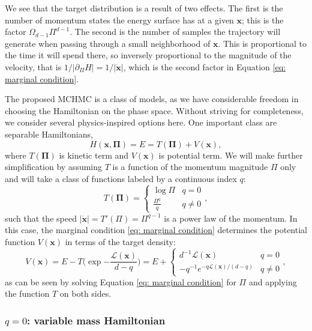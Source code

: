 \documentclass[twoside,11pt]{article}
\newcommand{\p}{\boldsymbol{\Pi}}
\newcommand{\x}{\boldsymbol{x}}
\begin{document}
We see that the target distribution is a result of two effects. The first is the number of momentum states the energy surface has at a given $\x$; this is the factor $\Omega_{d-1} \Pi^{d-1}$. The second is the number of samples the trajectory will generate when passing through a small neighborhood of $\x$. This is proportional to the time it will spend there, so inversely proportional to the magnitude of the velocity, that is $1 / \vert \partial_{\Pi} H \vert = 1 / \vert \dot{\x}\vert$, which is the second factor in Equation \eqref{eq: marginal condition}.

The proposed MCHMC is a class of 
models, as 
we have considerable freedom in choosing the Hamiltonian on the phase space. 
Without striving for completeness, we consider several physics-inspired options here.  
One important class are separable 
Hamiltonians,
\begin{equation}
    H(\x,\p)=E=T(\p)+V(\x), 
    \label{separable}
\end{equation}
where $T(\p)$ is kinetic term and 
$V(\x)$ is potential term. We will 
make further simplification by assuming $T$ is a function of the momentum magnitude $\Pi$ only and will take a class of functions labeled by a continuous index $q$: 
\begin{equation}
    T(\p) = 
    \begin{cases}
    \log \Pi & q = 0\\
    \frac{\Pi^q}{q} & q \neq 0
    \end{cases},\label{eq:qcases}
\end{equation}
such that the speed $\vert \dot{\x} \vert = T'(\Pi)= \Pi^{q-1}$ is a power law of the momentum.
In this case, the marginal condition \eqref{eq: marginal condition} determines the potential function $V(\x)$ in terms of the target density:
\begin{equation} \label{eq: V}
    V(\x) = E - T \bigg( \exp{-\frac{\mathcal{L}(\x)}{d - q}} \bigg) = 
    E + \begin{cases}
    d^{-1} \mathcal{L}(\x) &  q = 0\\
    - q^{-1} e^{- q \mathcal{L}(\x) / (d- q)} & q \neq 0
    \end{cases},
\end{equation}
as can be seen by solving Equation \eqref{eq: marginal condition} for $\Pi$ and applying the function $T$ on both sides.

\subsubsection{$q=0$: variable mass Hamiltonian} \label{sec: pdm}
\end{document}
